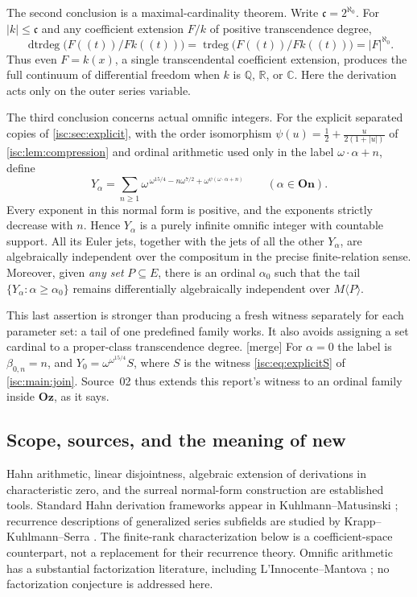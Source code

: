 \documentclass[11pt,letterpaper]{article}
\theoremstyle{definition}
\theoremstyle{remark}
\newcommand{\Oz}{\mathbf{Oz}}
\newcommand{\On}{\mathbf{On}}
\newcommand{\R}{\mathbb R}
\newcommand{\C}{\mathbb C}
\newcommand{\Q}{\mathbb Q}
\newcommand{\trdeg}{\operatorname{trdeg}}
\newcommand{\mtag}{\textup{[merge]}}%
\newcommand{\cc}{\mathfrak c}
\newcommand{\dtrdeg}{\operatorname{dtrdeg}}
\numberwithin{equation}{section}
\begin{document}
The second conclusion is a maximal-cardinality theorem. Write
$\cc=2^{\aleph_0}$. For $|k|\le\cc$ and any coefficient extension $F/k$ of
positive transcendence degree,
\begin{equation}\label{isc:cp:eq:introdimension}
 \dtrdeg\bigl(F((t))/F k((t))\bigr)
 =\trdeg\bigl(F((t))/F k((t))\bigr)=|F|^{\aleph_0}.
\end{equation}
Thus even $F=k(x)$, a single transcendental coefficient extension, produces
the full continuum of differential freedom when $k$ is $\Q$, $\R$, or $\C$.
Here the derivation acts only on the outer series variable.

The third conclusion concerns actual omnific integers. For the explicit
separated copies of \cref{isc:sec:explicit}, with the order isomorphism
$\psi(u)=\frac12+\frac{u}{2(1+|u|)}$ of \cref{isc:lem:compression} and
ordinal arithmetic used only in the label $\omega\cdot\alpha+n$, define
\begin{equation}\label{isc:cp:eq:introwitness}
 Y_\alpha
 =\sum_{n\ge1}
 \omega^{\,\omega^{15/4}-n\omega^{7/2}
                    +\omega^{\psi(\omega\cdot\alpha+n)}}
 \qquad(\alpha\in\On).
\end{equation}
Every exponent in this normal form is positive, and the exponents strictly
decrease with $n$. Hence $Y_\alpha$ is a purely infinite omnific integer with
countable support. All its Euler jets, together with the jets of all the
other $Y_\alpha$, are algebraically independent over the compositum in the
precise finite-relation sense. Moreover, given \emph{any set} $P\subseteq E$,
there is an ordinal $\alpha_0$ such that the tail
$\{Y_\alpha:\alpha\ge\alpha_0\}$ remains differentially algebraically
independent over $M\langle P\rangle$.

This last assertion is stronger than producing a fresh witness separately
for each parameter set: a tail of one predefined family works. It also
avoids assigning a set cardinal to a proper-class transcendence degree.
\mtag{} For $\alpha=0$ the label is $\beta_{0,n}=n$, and
$Y_0=\omega^{\omega^{15/4}}S$, where $S$ is the witness
\eqref{isc:eq:explicitS} of \cref{isc:main:join}. Source~02 thus extends this
report's witness to an ordinal family inside $\Oz$, as it says.

\subsection{Scope, sources, and the meaning of new}\label{isc:cp:sub:scope}

Hahn arithmetic, linear disjointness, algebraic extension of derivations in
characteristic zero, and the surreal normal-form construction are
established tools. Standard Hahn derivation frameworks appear in
Kuhlmann--Matusinski \cite{KM}; recurrence descriptions of generalized
series subfields are studied by Krapp--Kuhlmann--Serra \cite{KKS}. The
finite-rank characterization below is a coefficient-space counterpart, not a
replacement for their recurrence theory. Omnific arithmetic has a
substantial factorization literature, including L'Innocente--Mantova
\cite{LM}; no factorization conjecture is addressed here.
\end{document}
